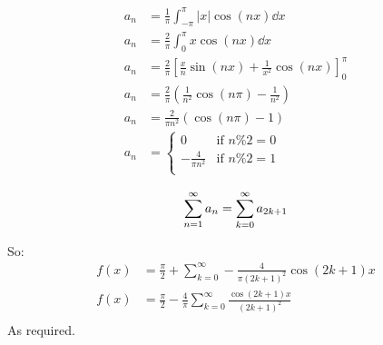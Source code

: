 \documentclass[10pt,\jkfside,a4paper]{article}
\begin{document}
\begin{enumerate}
\[
\begin{split}
a_n &= \frac{1}{\pi} \int^\pi_{-\pi} |x|\cos(nx) \dd{x} \\
a_n &= \frac{2}{\pi} \int^\pi_0 x\cos(nx) \dd{x} \\
a_n &= \frac{2}{\pi} \left[ \frac{x}{n}\sin(nx) + \frac{1}{x^2}\cos(nx) \right]^\pi_0 \\
a_n &= \frac{2}{\pi} \left(\frac{1}{n^2}\cos(n\pi) - \frac{1}{n^2}\right) \\
a_n &= \frac{2}{\pi n^2}(\cos(n\pi) - 1) \\
a_n &= \begin{cases}
0 & \text{if } n \% 2 = 0 \\
-\frac{4}{\pi n^2} & \text{if } n \% 2 = 1 \\
\end{cases}
\end{split}
\]

\[
\sum^\infty_{n=1} a_n = \sum^\infty_{k=0} a_{2k+1} \\
\]

So:
\[
\begin{split}
f(x) &= \frac{\pi}{2} + \sum^\infty_{k=0} -\frac{4}{\pi (2k + 1)^2} \cos(2k+1)x \\
f(x) &= \frac{\pi}{2} - \frac{4}{\pi}\sum^\infty_{k=0} \frac{\cos(2k+1)x}{(2k + 1)^2} \\
\end{split}
\]
As required.

\end{enumerate}
\end{document}
